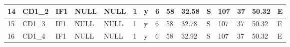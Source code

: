 {\begin{table}[]
\begin{tabular}{|l|l|l|l|l|l|l|l|l|l|l|l|l|l|l|}
		14                                & CD1\_2                                    & IF1                                       & NULL                            & NULL                            & 1                               & y                                    & 6                                                                                    & 58                                                                                   & 32.58                                                                                & S                                                                                 & 107                                                                                   & 37                                                                                    & 50.32                                                                                 & E                                                                                  \\ \hline
		15                                & CD1\_3                                    & IF1                                       & NULL                            & NULL                            & 1                               & y                                    & 6                                                                                    & 58                                                                                   & 32.78                                                                                & S                                                                                 & 107                                                                                   & 37                                                                                    & 50.32                                                                                 & E                                                                                  \\ \hline
		16                                & CD1\_4                                    & IF1                                       & NULL                            & NULL                            & 1                               & y                                    & 6                                                                                    & 58                                                                                   & 32.92                                                                                & S                                                                                 & 107                                                                                   & 37                                                                                    & 50.32                                                                                 & E                                                                                  \\ \hline

\end{tabular}
\end{table}}
